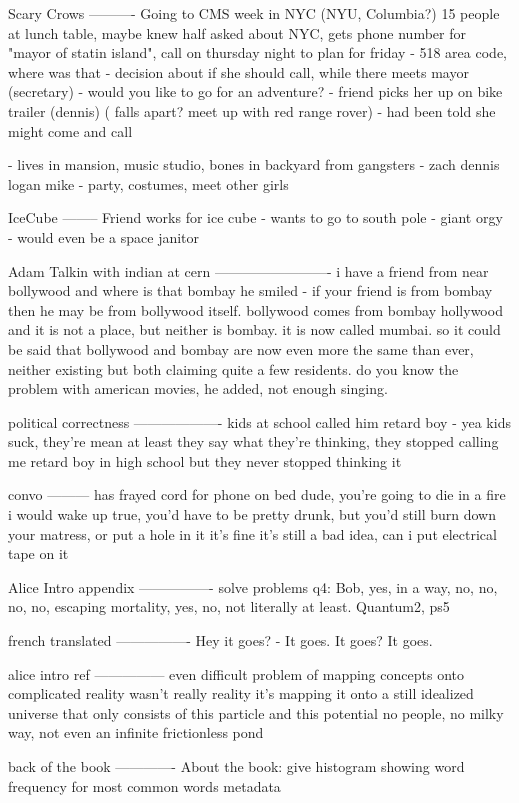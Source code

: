 Scary Crows
----------
Going to CMS week in NYC (NYU, Columbia?)
 15 people at lunch table, maybe knew half
 asked about NYC, gets phone number for "mayor of statin island", call on thursday night to plan for friday
 - 518 area code, where was that
 - decision about if she should call, while there meets mayor (secretary)
  - would you like to go for an adventure?
   - friend picks her up on bike trailer (dennis)
    ( falls apart? meet up with red range rover)
   - had been told she might come and call
   
  - lives in mansion, music studio, bones in backyard from gangsters
  - zach dennis logan mike
  - party, costumes, meet other girls 



IceCube
--------
Friend works for ice cube
 - wants to go to south pole
  - giant orgy
  - would even be a space janitor


Adam Talkin with indian at cern
-------------------------
i have a friend from near bollywood
and where is that
bombay
he smiled - if your friend is from bombay then he may be from bollywood itself. bollywood comes from bombay hollywood and it is not a place, but neither is bombay. it is now called mumbai. so it could be said that bollywood and bombay are now even more the same than ever, neither existing but both claiming quite a few residents. do you know the problem with american movies, he added, not enough singing.

political correctness
-------------------
kids at school called him retard boy 
 - yea kids suck, they're mean
at least they say what they're thinking, they stopped calling me retard boy in high school but they never stopped thinking it


convo
---------
 has frayed cord for phone on bed
 dude, you're going to die in a fire
 i would wake up
 true, you'd have to be pretty drunk, but you'd still burn down your matress, or put a hole in it
 it's fine
 it's still a bad idea, can i put electrical tape on it




Alice Intro appendix
----------------
solve problems
q4: 
Bob, yes, in a way, no, no, no, no, escaping mortality, yes, no, not literally at least.
Quantum2, ps5

french translated
----------------
Hey it goes?
 - It goes. It goes?
It goes.



alice intro ref
---------------
even difficult problem of mapping concepts onto complicated reality wasn't really reality
it's mapping it onto a still idealized universe that only consists of this particle and this potential
no people, no milky way, not even an infinite frictionless pond

back of the book
-------------
About the book:
give histogram showing word frequency for most common words
metadata
